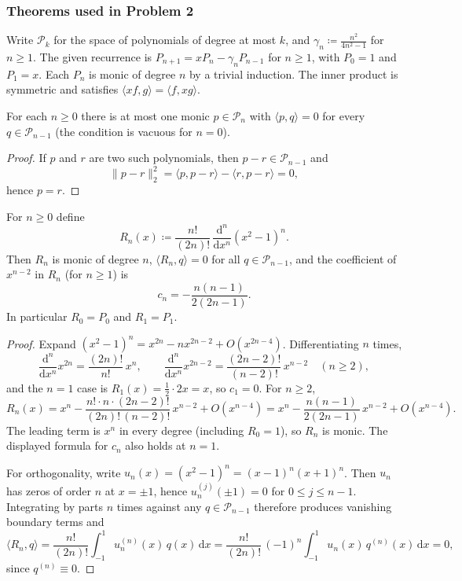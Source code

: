 \documentclass[11pt,a4paper]{article}
\begin{document}
\setcounter{section}{2}

\subsubsection{Theorems used in Problem 2}

Write \(\mathcal{P}_{k}\) for the space of polynomials of degree at most \(k\), and \(\gamma_{n}\coloneqq\frac{n^{2}}{4n^{2}-1}\) for \(n\ge 1\). The given recurrence is \(P_{n+1}=xP_{n}-\gamma_{n}P_{n-1}\) for \(n\ge 1\), with \(P_{0}=1\) and \(P_{1}=x\). Each \(P_{n}\) is monic of degree \(n\) by a trivial induction. The inner product is symmetric and satisfies \(\langle xf,g\rangle=\langle f,xg\rangle\).

\begin{lemma}
\label{lem:monic-op-unique}
For each \(n\ge 0\) there is at most one monic \(p\in\mathcal{P}_{n}\) with \(\langle p,q\rangle=0\) for every \(q\in\mathcal{P}_{n-1}\) (the condition is vacuous for \(n=0\)).
\end{lemma}

\begin{proof}
If \(p\) and \(r\) are two such polynomials, then \(p-r\in\mathcal{P}_{n-1}\) and
\[
\|p-r\|_{2}^{2}
=
\langle p,p-r\rangle-\langle r,p-r\rangle
=
0,
\]
hence \(p=r\).
\end{proof}

\begin{lemma}
\label{lem:rodrigues}
For \(n\ge 0\) define
\[
R_{n}(x)
\coloneqq
\frac{n!}{(2n)!}\,
\frac{\mathrm{d}^{n}}{\mathrm{d}x^{n}}(x^{2}-1)^{n}.
\]
Then \(R_{n}\) is monic of degree \(n\), \(\langle R_{n},q\rangle=0\) for all \(q\in\mathcal{P}_{n-1}\), and the coefficient of \(x^{n-2}\) in \(R_{n}\) (for \(n\ge 1\)) is
\[
c_{n}
=
-\frac{n(n-1)}{2(2n-1)}.
\]
In particular \(R_{0}=P_{0}\) and \(R_{1}=P_{1}\).
\end{lemma}

\begin{proof}
Expand \((x^{2}-1)^{n}=x^{2n}-n x^{2n-2}+O(x^{2n-4})\). Differentiating \(n\) times,
\[
\frac{\mathrm{d}^{n}}{\mathrm{d}x^{n}}x^{2n}
=
\frac{(2n)!}{n!}\,x^{n},
\qquad
\frac{\mathrm{d}^{n}}{\mathrm{d}x^{n}}x^{2n-2}
=
\frac{(2n-2)!}{(n-2)!}\,x^{n-2}
\quad(n\ge 2),
\]
and the \(n=1\) case is \(R_{1}(x)=\frac12\cdot 2x=x\), so \(c_{1}=0\). For \(n\ge 2\),
\[
R_{n}(x)
=
x^{n}
-
\frac{n!\cdot n\cdot(2n-2)!}{(2n)!\,(n-2)!}\,x^{n-2}
+
O(x^{n-4})
=
x^{n}
-
\frac{n(n-1)}{2(2n-1)}\,x^{n-2}
+
O(x^{n-4}).
\]
The leading term is \(x^{n}\) in every degree (including \(R_{0}=1\)), so \(R_{n}\) is monic. The displayed formula for \(c_{n}\) also holds at \(n=1\).

For orthogonality, write \(u_{n}(x)=(x^{2}-1)^{n}=(x-1)^{n}(x+1)^{n}\). Then \(u_{n}\) has zeros of order \(n\) at \(x=\pm 1\), hence \(u_{n}^{(j)}(\pm 1)=0\) for \(0\le j\le n-1\). Integrating by parts \(n\) times against any \(q\in\mathcal{P}_{n-1}\) therefore produces vanishing boundary terms and
\[
\langle R_{n},q\rangle
=
\frac{n!}{(2n)!}
\int_{-1}^{1} u_{n}^{(n)}(x)\,q(x)\,\mathrm{d}x
=
\frac{n!}{(2n)!}\,(-1)^{n}
\int_{-1}^{1} u_{n}(x)\,q^{(n)}(x)\,\mathrm{d}x
=
0,
\]
since \(q^{(n)}\equiv 0\).
\end{proof}
\end{document}
